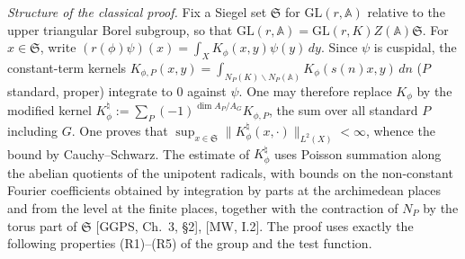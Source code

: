 \documentclass[12pt]{article}
\newcommand{\A}{\mathbb{A}}
\newcommand{\GL}{\mathrm{GL}}
\theoremstyle{plain}
\theoremstyle{definition}
\begin{document}
\emph{Structure of the classical proof.} Fix a Siegel set $\mathfrak S$ for $\GL(r,\A)$ relative to the upper triangular Borel subgroup, so that $\GL(r,\A)=\GL(r,K)Z(\A)\mathfrak S$. For $x\in\mathfrak S$, write $(r(\phi)\psi)(x)=\int_XK_\phi(x,y)\psi(y)\,dy$. Since $\psi$ is cuspidal, the constant-term kernels $K_{\phi,P}(x,y)=\int_{N_P(K)\backslash N_P(\A)}K_\phi(s(n)x,y)\,dn$ ($P$ standard, proper) integrate to $0$ against $\psi$. One may therefore replace $K_\phi$ by the modified kernel $K_\phi^\natural:=\sum_{P}(-1)^{\dim A_P/A_G}K_{\phi,P}$, the sum over all standard $P$ including $G$. One proves that $\sup_{x\in\mathfrak S}\|K^\natural_\phi(x,\cdot)\|_{L^2(X)}<\infty$, whence the bound by Cauchy--Schwarz. The estimate of $K^\natural_\phi$ uses Poisson summation along the abelian quotients of the unipotent radicals, with bounds on the non-constant Fourier coefficients obtained by integration by parts at the archimedean places and from the level at the finite places, together with the contraction of $N_P$ by the torus part of $\mathfrak S$ [GGPS, Ch.~3, \S2], [MW, I.2]. The proof uses exactly the following properties (R1)--(R5) of the group and the test function.
\end{document}
